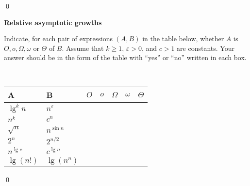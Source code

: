 \sol \qed

 \textbf{Relative asymptotic growths}

Indicate, for each pair of expressions $(A,B)$ in the table below, whether $A$ is $O, o, \Omega, \omega$ or $\Theta$ of $B$. Assume that $k \geq 1, \, \varepsilon > 0$, and $c > 1$ are constants. Your answer should be in the form of the table with ``yes'' or ``no'' written in each box.

\,

\begin{center}
\begin{tabular}{|l|l|l|l|l|l|l|}
    \hline
    A           & B                 & $O$ & $o$ & $\Omega$ & $\omega$ & $\Theta$ \\\hline
    $\lg^k n$   & $n^{\varepsilon}$ &     &     &          &          &                         \\\hline
    $n^k$       & $c^n$             &     &     &          &          &                         \\\hline
    $\sqrt{n}$  & $n^{\sin n}$      &     &     &          &          &                         \\\hline
    $2^n$       & $2^{n/2}$         &     &     &          &          &                         \\\hline
    $n^{\lg c}$ & $c^{\lg n}$       &     &     &          &          &                         \\\hline
    $\lg(n!)$   & $\lg(n^n)$        &     &     &          &          &                        \\\hline
\end{tabular}
\end{center}
\qed


